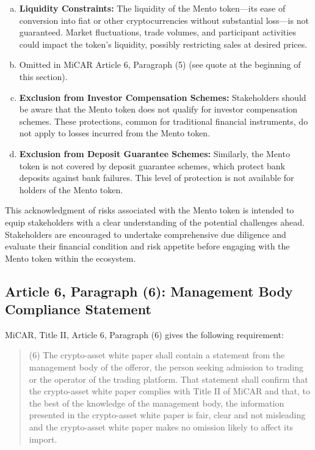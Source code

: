\documentclass[a4paper]{article}
\theoremstyle{definition}
\begin{document}
\begin{appendices}
\begin{enumerate}[(a)]
    \item \textbf{Liquidity Constraints:} The liquidity of the Mento token---its ease of conversion into fiat or other cryptocurrencies without substantial loss---is not guaranteed. Market fluctuations, trade volumes, and participant activities could impact the token's liquidity, possibly restricting sales at desired prices.

    \item Omitted in MiCAR Article 6, Paragraph (5) (see quote at the beginning of this section). 
    
    \item \textbf{Exclusion from Investor Compensation Schemes:} Stakeholders should be aware that the Mento token does not qualify for investor compensation schemes. These protections, common for traditional financial instruments, do not apply to losses incurred from the Mento token.
    
    \item \textbf{Exclusion from Deposit Guarantee Schemes:} Similarly, the Mento token is not covered by deposit guarantee schemes, which protect bank deposits against bank failures. This level of protection is not available for holders of  the Mento token.
\end{enumerate}

This acknowledgment of risks associated with the Mento token is intended to equip stakeholders with a clear understanding of the potential challenges ahead. Stakeholders are encouraged to undertake comprehensive due diligence and evaluate their financial condition and risk appetite before engaging with the Mento token within the ecosystem.

\subsection{Article 6, Paragraph (6): Management Body Compliance Statement}

MiCAR, Title II, Article 6, Paragraph (6) gives the following requirement:
\begin{quote}
    (6) The crypto-asset white paper shall contain a statement from the management body of the offeror, the person seeking admission to trading or the operator of the trading platform. That statement shall confirm that the crypto-asset white paper complies with Title II of MiCAR and that, to the best of the knowledge of the management body, the information presented in the crypto-asset white paper is fair, clear and not misleading and the crypto-asset white paper makes no omission likely to affect its import.
\end{quote}


\end{appendices}
\end{document}
